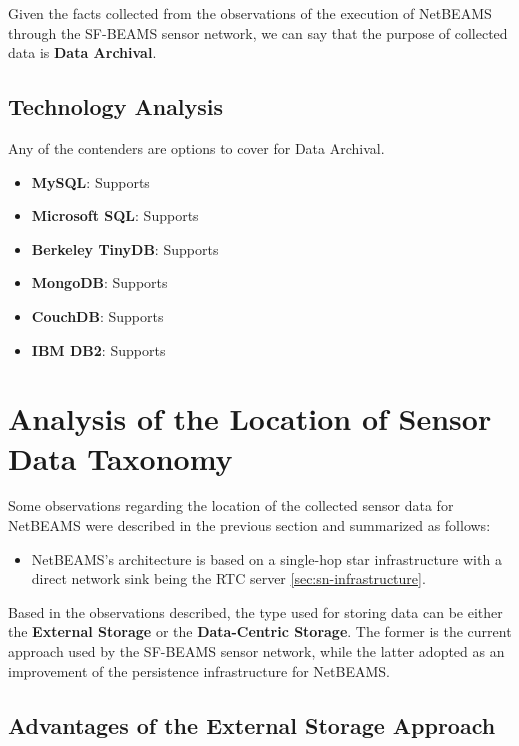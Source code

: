 Given the facts collected from the observations of the execution of NetBEAMS
through the SF-BEAMS sensor network, we can say that the purpose of collected
data is \textbf{Data Archival}.

\subsection{Technology Analysis}

Any of the contenders are options to cover for Data Archival.

\begin{itemize}
  \item \textbf{MySQL}: Supports
  \item \textbf{Microsoft SQL}: Supports
  \item \textbf{Berkeley TinyDB}: Supports
  \item \textbf{MongoDB}: Supports
  \item \textbf{CouchDB}: Supports
  \item \textbf{IBM DB2}: Supports
\end{itemize}

\section{Analysis of the Location of Sensor Data Taxonomy}
\label{sec:sn-data-location}

Some observations regarding the location of the collected sensor data for
NetBEAMS were described in the previous section and summarized as follows:

\begin{itemize}
  \item NetBEAMS's architecture is based on a single-hop star infrastructure 
   with a direct network sink being the RTC server \ref{sec:sn-infrastructure}.
\end{itemize}

Based in the observations described, the type used for storing
data can be either the \textbf{External Storage} or the
\textbf{Data-Centric Storage}. The former is the current approach used by the
SF-BEAMS sensor network, while the latter adopted as an improvement of the
persistence infrastructure for NetBEAMS.

\subsection{Advantages of the External Storage Approach}

